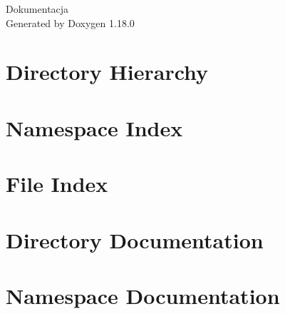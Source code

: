 \documentclass[twoside]{book}
\newcommand{\+}{\discretionary{\mbox{\scriptsize$\hookleftarrow$}}{}{}}
\newcommand{\clearemptydoublepage}{%
    \newpage{\pagestyle{empty}\cleardoublepage}%
  }
\begin{document}
  \raggedbottom
    \hypersetup{pageanchor=false,
                bookmarksnumbered=true,
                pdfencoding=unicode
               }
  \begin{titlepage}
  \vspace*{7cm}
  \begin{center}%
  {\Large Dokumentacja}\\
  \vspace*{1cm}
  {\large Generated by Doxygen 1.18.0}\\
  \end{center}
  \end{titlepage}
  \clearemptydoublepage
  \tableofcontents
  \clearemptydoublepage
  \hypersetup{pageanchor=true}

\chapter{Directory Hierarchy}

\chapter{Namespace Index}

\chapter{File Index}

\chapter{Directory Documentation}







\chapter{Namespace Documentation}


\end{document}
